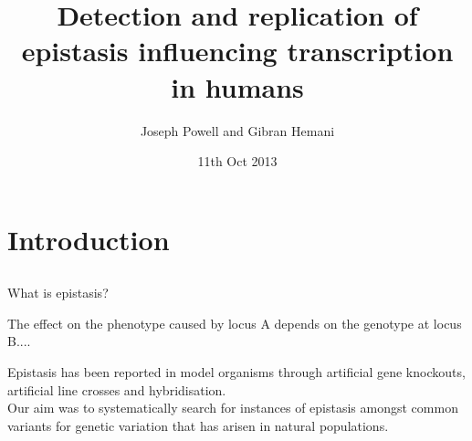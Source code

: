 \documentclass{beamer}
\begin{document}
\title[Epistasis influencing transcription in humans]{Detection and replication of epistasis influencing transcription in humans}
\author{Joseph Powell and Gibran Hemani}
\date{11th Oct 2013}

\begin{frame}
\titlepage
\end{frame}


\section{Introduction}
\subsection{}
\begin{frame}{What is epistasis?}
\begin{definition}
{The effect on the phenotype caused by locus A depends on the genotype at locus B....}
\end{definition}
\vspace{0.5cm}
Epistasis has been reported in model organisms through artificial gene knockouts, artificial line crosses and hybridisation. \\
\vspace{0.5cm}
Our aim was to systematically search for instances of epistasis amongst common variants for genetic variation that has arisen in natural populations.\end{frame}
\end{document}
